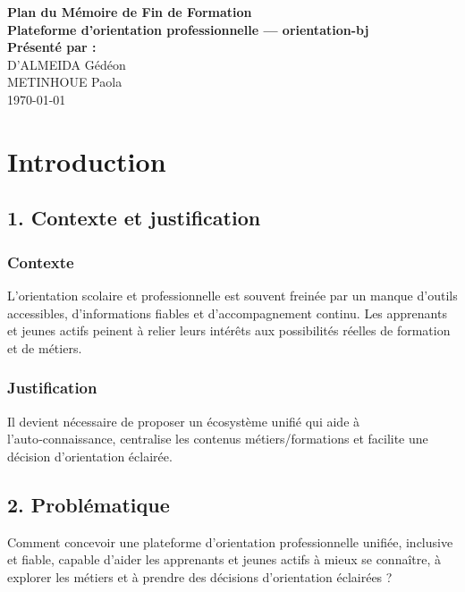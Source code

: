 \documentclass[12pt,a4paper]{report}
\begin{document}
\begin{titlepage}
\centering
\vspace*{2cm}
{\LARGE \textbf{Plan du Mémoire de Fin de Formation}} \\[0.8cm]
{\Large \textbf{Plateforme d’orientation professionnelle — orientation-bj}} \\[2cm]
{\large \textbf{Présenté par :}} \\[0.3cm]
{\large D'ALMEIDA Gédéon} \\
{\large METINHOUE Paola} \\[2cm]
{\large \today}
\end{titlepage}

\tableofcontents
\newpage

\chapter*{Introduction}

\section*{1. Contexte et justification}
\subsection*{Contexte}
L’orientation scolaire et professionnelle est souvent freinée par un manque d’outils accessibles, d’informations fiables et d’accompagnement continu. Les apprenants et jeunes actifs peinent à relier leurs intérêts aux possibilités réelles de formation et de métiers.

\subsection*{Justification}
Il devient nécessaire de proposer un écosystème unifié qui aide à l’auto‑connaissance, centralise les contenus métiers/formations et facilite une décision d’orientation éclairée.

\section*{2. Problématique}
Comment concevoir une plateforme d’orientation professionnelle unifiée, inclusive et fiable, capable d’aider les apprenants et jeunes actifs à mieux se connaître, à explorer les métiers et à prendre des décisions d’orientation éclairées ?
\end{document}
